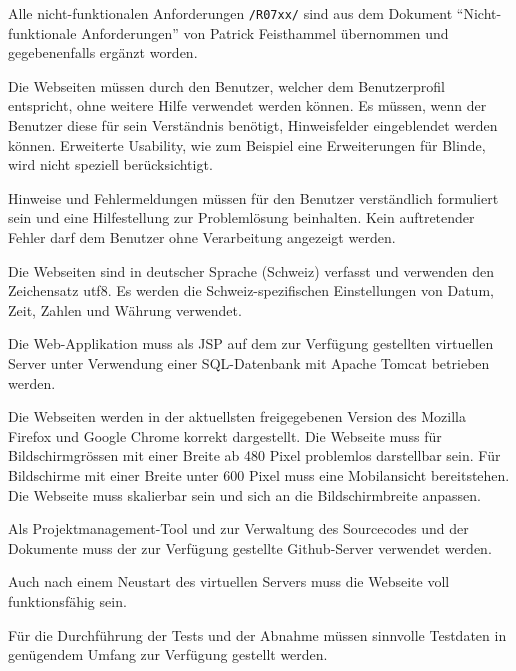 Alle nicht-funktionalen Anforderungen \texttt{/R07xx/} sind aus dem Dokument "`Nicht-funktionale Anforderungen"' von Patrick Feisthammel \cite{patfeist15nifunanf} übernommen und gegebenenfalls ergänzt worden.

Die Webseiten müssen durch den Benutzer, welcher dem Benutzerprofil entspricht, ohne weitere Hilfe verwendet werden können. Es müssen, wenn der Benutzer diese für sein Verständnis benötigt, Hinweisfelder eingeblendet werden können.
Erweiterte Usability, wie zum Beispiel eine Erweiterungen für Blinde, wird nicht speziell berücksichtigt.

Hinweise und Fehlermeldungen müssen für den Benutzer verständlich formuliert sein und eine Hilfestellung zur Problemlösung beinhalten. Kein auftretender Fehler darf dem Benutzer ohne Verarbeitung angezeigt werden.

Die Webseiten sind in deutscher Sprache (Schweiz) verfasst und verwenden den Zeichensatz \gls{utf8}. Es werden die Schweiz-spezifischen Einstellungen von Datum, Zeit, Zahlen und Währung verwendet.

Die Web-Applikation muss als \gls{JSP} auf dem zur Verfügung gestellten virtuellen Server unter Verwendung einer SQL-Datenbank mit Apache Tomcat betrieben werden.

Die Webseiten werden in der aktuellsten freigegebenen Version des Mozilla Firefox und Google Chrome korrekt dargestellt. Die Webseite muss für Bildschirmgrössen mit einer Breite ab 480 Pixel problemlos darstellbar sein. Für Bildschirme mit einer Breite unter 600 Pixel muss eine Mobilansicht bereitstehen. Die Webseite muss skalierbar sein und sich an die Bildschirmbreite anpassen.

Als Projektmanagement-Tool und zur Verwaltung des Sourcecodes und der Dokumente muss der zur Verfügung gestellte Github-Server verwendet werden.

Auch nach einem Neustart des virtuellen Servers muss die Webseite voll funktionsfähig sein.

Für die Durchführung der Tests und der Abnahme müssen sinnvolle Testdaten in genügendem Umfang zur Verfügung gestellt werden.

